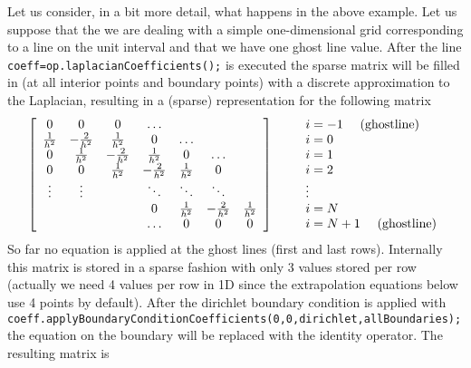 Let us consider, in a bit more detail, what happens in the above example. Let us suppose
that the we are dealing with a simple one-dimensional grid corresponding to a line on the
unit interval and that we have one ghost line value.
After the line {\tt coeff=op.laplacianCoefficients();} is executed the sparse matrix will be
filled in (at all interior points and boundary points) with a discrete approximation to the 
Laplacian, resulting in a (sparse) representation for the following matrix
\newcommand{\dxa}{{1\over h^2}}
\newcommand{\dxb}{-{2\over h^2}}
\newcommand{\dxc}{{1\over 2h}}
\begin{equation*}
   \left[\begin{array}{ccccccc}
         0    & 0    & 0    &\ldots&      &      &    \\
         \dxa & \dxb & \dxa & 0    &\ldots&      &   \\
         0    & \dxa & \dxb & \dxa &  0   &\ldots&   \\
         0    &  0   & \dxa & \dxb & \dxa &  0   &   \\
        \vdots&\vdots&      &\ddots&\ddots&\ddots&    \\
              &      &      &  0   & \dxa & \dxb & \dxa \\
              &      &      &\ldots&  0   &   0  &  0   
    \end{array} \right]
  \qquad
   \begin{array}{l}
    i=-1~~~~{\rm (ghost line)}\\i=0\\i=1\\i=2\\ \vdots \\ i=N\\ i=N+1~~~~{\rm (ghost line)}
   \end{array}
\end{equation*}
So far no equation is applied at the ghost lines (first and last rows).
Internally this matrix is stored in a sparse fashion with only 3 values stored per row (actually we need 4 values
per row in 1D since the extrapolation equations below use 4 points by default).
After the dirichlet boundary condition is applied with {\tt coeff.apply\-Boundary\-Condition\-Coefficients(0,0,dirichlet,allBoundaries);} the equation on the boundary will be replaced with the identity operator. The resulting
matrix is
